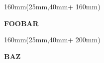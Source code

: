 \documentclass[a4paper,draft]{article}
\newcommand\StartX{25mm} \newcommand\StartY{40mm}
\newcommand\Wi{160mm} \newcommand\Wii{40mm} \newcommand\Wiii{60mm}
\newcommand\Hi{20mm}  \newcommand\Hii{100mm}
\begin{document}
\begin{textblock*}{\Wi}(\StartX,\StartY + 160mm)%
  \noindent\colorbox[rgb]{0,1,1}{%
    \begin{minipage}[c][\Hi - 2\fboxsep][c]{\linewidth - 2\fboxsep}%
      \centering\Huge\textbf{FOOBAR}%
    \end{minipage}}%
\end{textblock*}

\begin{textblock*}{\Wi}(\StartX,\StartY + 200mm)%
  \noindent\colorbox[rgb]{1,0,0}{%
    \begin{minipage}[c][\Hi - 2\fboxsep][c]{\linewidth - 2\fboxsep}%
      \centering\Huge\textbf{BAZ}%
    \end{minipage}}%
\end{textblock*}
\end{document}
